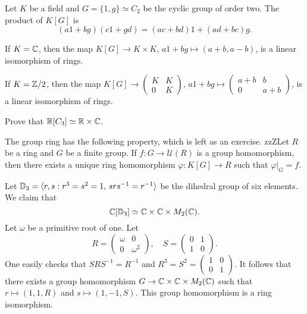 \begin{example}
	Let $K$ be a field and 
	$G=\{1,g\}\simeq C_2$ be the cyclic group of order two. The product
	of $K[G]$ is 
	\[
	(a1+bg)(c1+gd)=(ac+bd)1+(ad+bc)g.
	\]
	
	If $K=\mathbb{C}$, then the map $K[G]\to K\times K$, $a1+bg\mapsto (a+b,a-b)$, 
	is a linear isomorphism of rings. 
	
	If $K=\mathbb{Z}/2$, then the map $K[G]\to\begin{pmatrix}
		K&K\\
		0&K
	\end{pmatrix}$, $a1+bg\mapsto\begin{pmatrix}
		a+b&b\\
		0&a+b		
	\end{pmatrix}$, is a linear isomorphism of rings. 
\end{example}

\begin{exercise}
	Prove that $\mathbb{R}[C_3]\simeq\mathbb{R}\times\mathbb{C}$. 	
\end{exercise}

The group ring has the following property, which is left as an exercise. 
zzZLet $R$ be a ring and
$G$ be a finite group. If $f\colon G\to\mathcal{U}(R)$ is a group homomorphism, 
then there exists a unique ring homomorphism $\varphi\colon K[G]\to R$ such that
$\varphi|_G=f$. 

\begin{example}
	Let $\mathbb{D}_3=\langle r,s:r^3=s^2=1,\,srs^{-1}=r^{-1}\rangle$ be the dihedral
	group of six elements. We claim that 
	\[
	\mathbb{C}[\mathbb{D}_3]\simeq\mathbb{C}\times\mathbb{C}\times M_2(\mathbb{C}).
	\]
	Let $\omega$ be a primitive root of one. Let 
	\[
	R=\begin{pmatrix}
		\omega&0\\
		0&\omega^2	
	\end{pmatrix},
	\quad
	S=\begin{pmatrix}
		0&1\\
		1&0
	\end{pmatrix}.
 	\]
 	One easily checks that $SRS^{-1}=R^{-1}$ and $R^3=S^2=\begin{pmatrix}
		1&0\\
		0&1	
	\end{pmatrix}$. It follows that there exists a group homomorphism
	$G\to\mathbb{C}\times\mathbb{C}\times M_2(\mathbb{C})$ such that
	$r\mapsto (1,1,R)$ and $s\mapsto (1,-1,S)$. This group homomorphism
	is a ring isomorphism.  
\end{example}




 
